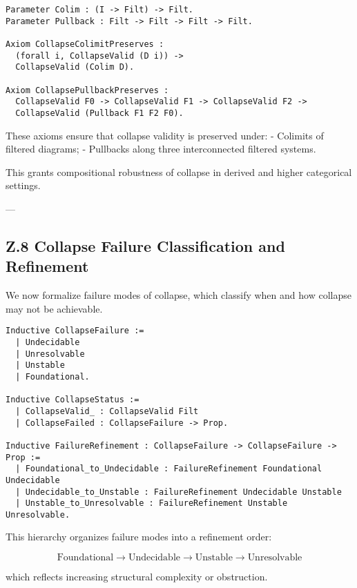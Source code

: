 \documentclass[11pt]{article}
\begin{document}
\begin{lstlisting}[language=Coq]
Parameter Colim : (I -> Filt) -> Filt.
Parameter Pullback : Filt -> Filt -> Filt -> Filt.

Axiom CollapseColimitPreserves :
  (forall i, CollapseValid (D i)) ->
  CollapseValid (Colim D).

Axiom CollapsePullbackPreserves :
  CollapseValid F0 -> CollapseValid F1 -> CollapseValid F2 ->
  CollapseValid (Pullback F1 F2 F0).
\end{lstlisting}

These axioms ensure that collapse validity is preserved under:
- Colimits of filtered diagrams;
- Pullbacks along three interconnected filtered systems.

This grants compositional robustness of collapse in derived and higher categorical settings.

---

\subsection*{Z.8 Collapse Failure Classification and Refinement}

We now formalize failure modes of collapse, which classify when and how collapse may not be achievable.

\begin{lstlisting}[language=Coq]
Inductive CollapseFailure :=
  | Undecidable
  | Unresolvable
  | Unstable
  | Foundational.

Inductive CollapseStatus :=
  | CollapseValid_ : CollapseValid Filt
  | CollapseFailed : CollapseFailure -> Prop.

Inductive FailureRefinement : CollapseFailure -> CollapseFailure -> Prop :=
  | Foundational_to_Undecidable : FailureRefinement Foundational Undecidable
  | Undecidable_to_Unstable : FailureRefinement Undecidable Unstable
  | Unstable_to_Unresolvable : FailureRefinement Unstable Unresolvable.
\end{lstlisting}

This hierarchy organizes failure modes into a refinement order:

\[
\text{Foundational} \rightarrow \text{Undecidable} \rightarrow \text{Unstable} \rightarrow \text{Unresolvable}
\]

which reflects increasing structural complexity or obstruction.
\end{document}
